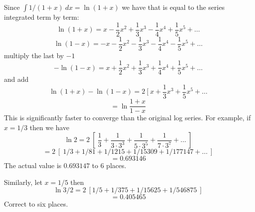 \documentclass[11pt, oneside]{article}
\begin{document}
Since $\int 1/(1+x) \ dx = \ln (1+x)$ we have that is equal to the series integrated term by term:
\[ \ln (1 + x) = x - \frac{1}{2} x^2 + \frac{1}{3} x^3 - \frac{1}{4} x^4 + \frac{1}{5} x^5 + \dots \]
\[ \ln (1 - x)= - x - \frac{1}{2} x^2 - \frac{1}{3} x^3 - \frac{1}{4} x^4 - \frac{1}{5} x^5 + \dots \]
multiply the last by $-1$
\[ - \ln (1 - x)= x + \frac{1}{2} x^2 + \frac{1}{3} x^3 + \frac{1}{4} x^4 + \frac{1}{5} x^5 + \dots \]
and add
\[ \ln (1+x) - \ln (1-x) = 2 \ [ \ x + \frac{1}{3} x^3 + \frac{1}{5} x^5 + \dots \]
\[ = \ln \frac{1+x}{1 - x} \]
This is significantly faster to converge than the original log series.  For example, if $x = 1/3$ then we have
\[ \ln 2 = 2 \ [ \ \frac{1}{3} + \frac{1}{3 \cdot 3^3} + \frac{1}{5 \cdot 3^5} + \frac{1}{7 \cdot 3^7} + \dots \ ]  \]
\[ = 2 \ [ \  1/3 + 1/81 + 1/1215 + 1/15309 + 1/177147 + \dots \ ] \]
\[ = 0.693146 \]
The actual value is $0.693147$ to 6 places.

Similarly, let $x = 1/5$ then
\[ \ln 3/2 = 2 \ [ 1/5 + 1/375 + 1/15625 + 1/546875 \ ] \]
\[ = 0.405465 \]
Correct to six places.
\end{document}
